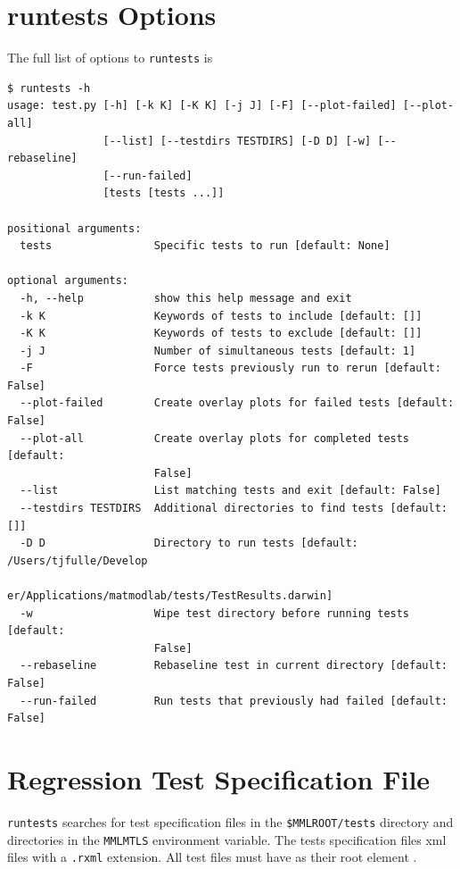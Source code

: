 \documentclass[12pt,report,strict]{SANDreport/SANDreport}
\newcommand{\runtests}{\texttt{runtests}}
\newcommand{\reqdtag}[1]{\Red{\texttt{<#1>}}}
\begin{document}
\section{runtests Options}
\label{sec:rtest-options}
The full list of options to \runtests{} is
\begin{verbatim}
$ runtests -h
usage: test.py [-h] [-k K] [-K K] [-j J] [-F] [--plot-failed] [--plot-all]
               [--list] [--testdirs TESTDIRS] [-D D] [-w] [--rebaseline]
               [--run-failed]
               [tests [tests ...]]

positional arguments:
  tests                Specific tests to run [default: None]

optional arguments:
  -h, --help           show this help message and exit
  -k K                 Keywords of tests to include [default: []]
  -K K                 Keywords of tests to exclude [default: []]
  -j J                 Number of simultaneous tests [default: 1]
  -F                   Force tests previously run to rerun [default: False]
  --plot-failed        Create overlay plots for failed tests [default: False]
  --plot-all           Create overlay plots for completed tests [default:
                       False]
  --list               List matching tests and exit [default: False]
  --testdirs TESTDIRS  Additional directories to find tests [default: []]
  -D D                 Directory to run tests [default: /Users/tjfulle/Develop
                       er/Applications/matmodlab/tests/TestResults.darwin]
  -w                   Wipe test directory before running tests [default:
                       False]
  --rebaseline         Rebaseline test in current directory [default: False]
  --run-failed         Run tests that previously had failed [default: False]
\end{verbatim}

\section{Regression Test Specification File}
\label{sec:rtest-spec}
\runtests{} searches for test specification files in the \verb|$MMLROOT/tests|
directory and directories in the \texttt{MMLMTLS} environment variable. The
tests specification files xml files with a \texttt{.rxml} extension. All test
files must have as their root element \reqdtag{rtest}.
\end{document}
